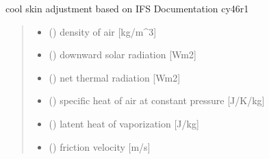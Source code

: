 \documentclass[letterpaper,10pt,english]{sphinxmanual}
\begin{document}
\begin{fulllineitems}
\label{\detokenize{users_guide:AirSeaFluxCode.cs_wl_subs.cs_ecmwf}}
\pysigstartsignatures
{}
\pysigstopsignatures
\sphinxAtStartPar
cool skin adjustment based on IFS Documentation cy46r1
\begin{quote}\begin{description}
\begin{itemize}
\item {} 
\sphinxAtStartPar
{} () \textendash{} density of air               {[}kg/m\textasciicircum{}3{]}

\item {} 
\sphinxAtStartPar
{} () \textendash{} downward solar radiation {[}Wm\sphinxhyphen{}2{]}

\item {} 
\sphinxAtStartPar
{} () \textendash{} net thermal radiation     {[}Wm\sphinxhyphen{}2{]}

\item {} 
\sphinxAtStartPar
{} () \textendash{} specific heat of air at constant pressure {[}J/K/kg{]}

\item {} 
\sphinxAtStartPar
{} () \textendash{} latent heat of vaporization   {[}J/kg{]}

\item {} 
\sphinxAtStartPar
{} () \textendash{} friction velocity         {[}m/s{]}


\end{itemize}
\end{description}
\end{quote}
\end{fulllineitems}
\end{document}

